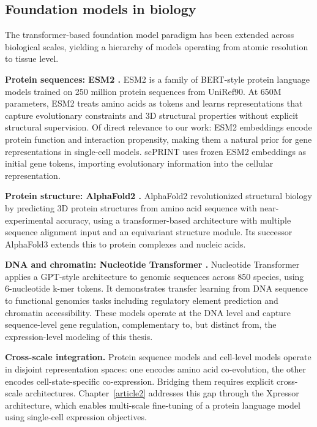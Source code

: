\subsection{Foundation models in biology}

The transformer-based foundation model paradigm has been extended across biological scales,
yielding a hierarchy of models operating from atomic resolution to tissue level.

\textbf{Protein sequences: ESM2 \cite{esm2}.} ESM2 is a family of \gls{BERT}-style protein
language models trained on 250 million protein sequences from UniRef90. At 650M parameters, ESM2
treats amino acids as tokens and learns representations that capture evolutionary constraints and
3D structural properties without explicit structural supervision. Of direct relevance to our work:
ESM2 embeddings encode protein function and interaction propensity, making them a natural prior
for gene representations in single-cell models. scPRINT uses frozen ESM2 embeddings as initial
gene tokens, importing evolutionary information into the cellular representation.

\textbf{Protein structure: AlphaFold2 \cite{jumperHighlyAccurateProtein2021}.} AlphaFold2
revolutionized structural biology by predicting 3D protein structures from amino acid sequence
with near-experimental accuracy, using a transformer-based architecture with multiple sequence
alignment input and an equivariant structure module. Its successor AlphaFold3 extends this to
protein complexes and nucleic acids.

\textbf{DNA and chromatin: Nucleotide Transformer \cite{dalla-torreNucleotideTransformerBuilding2024}.}
Nucleotide Transformer applies a \gls{GPT}-style architecture to genomic sequences across 850
species, using 6-nucleotide k-mer tokens. It demonstrates transfer learning from DNA sequence to
functional genomics tasks including regulatory element prediction and chromatin accessibility.
These models operate at the DNA level and capture sequence-level gene regulation, complementary
to, but distinct from, the expression-level modeling of this thesis.

\textbf{Cross-scale integration.} Protein sequence models and cell-level models operate in
disjoint representation spaces: one encodes amino acid co-evolution, the other encodes
cell-state-specific co-expression. Bridging them requires explicit cross-scale architectures.
Chapter~\ref{article2} addresses this gap through the Xpressor architecture, which enables
multi-scale fine-tuning of a protein language model using single-cell expression objectives.

